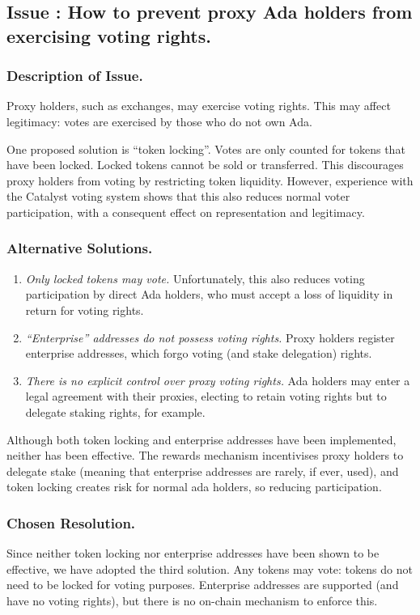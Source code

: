 \subsection*{Issue \theissue{}: How to prevent proxy Ada holders from exercising voting rights.}

\subsubsection*{Description of Issue.}

Proxy holders, such as exchanges, may exercise voting rights.  This may affect legitimacy: votes are exercised by those who do not own Ada.

One proposed solution is ``token locking''.  Votes are only counted for tokens that have been locked.  Locked tokens cannot be sold or transferred.
This discourages proxy holders from voting by restricting token liquidity.
However, experience with the Catalyst voting system shows that this also reduces normal voter participation,
with a consequent effect on representation and legitimacy. 

\subsubsection*{Alternative Solutions.}

\begin{enumerate}
\item
  \emph{Only locked tokens may vote.}  Unfortunately, this also reduces voting participation by direct Ada holders, who must accept a loss of liquidity in return for voting rights.
\item
  \emph{``Enterprise'' addresses do not possess voting rights.}  Proxy holders register enterprise addresses, which forgo voting (and stake delegation) rights.
\item
  \emph{There is no explicit control over proxy voting rights.}  Ada holders may enter a legal agreement with their proxies, electing to retain voting
  rights but to delegate staking rights, for example.  
\end{enumerate}

Although both token locking and enterprise addresses have been implemented, neither has been effective.
The rewards mechanism incentivises proxy holders to delegate stake (meaning that enterprise addresses are rarely, if ever, used),
and token locking creates risk for normal ada holders, so reducing participation.


\subsubsection*{Chosen Resolution.}

Since neither token locking nor enterprise addresses have been shown to be effective, we have adopted the third solution.
Any tokens may vote: tokens do not need to be locked for voting purposes.  Enterprise addresses are supported (and have no voting rights), but
there is no on-chain mechanism to enforce this.

\pagebreak
